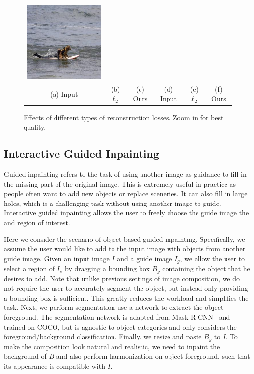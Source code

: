 \begin{figure}[h!]
\begin{tabular}{cccccc}
\includegraphics[width=.16\textwidth]{figures/loss/000000490171_synthesized_image.jpg}\\
(a) Input & (b) $\ell_2$ & (c) Ours & (d) Input & (e) $\ell_2$ & (f) Ours\\
\end{tabular}
\caption{Effects of different types of reconstruction losses. Zoom in for best quality.}
\label{fig:face}
\vspace{-5pt}
\end{figure}  

\subsection{Interactive Guided Inpainting}
\label{exp:guided} 

Guided inpainting refers to the task of using another image as guidance to fill in the missing part of the original image. This is extremely useful in practice as people often want to add new objects or replace sceneries. It can also fill in large holes, which is a challenging task without using another image to guide. Interactive guided inpainting allows the user to freely choose the guide image the and region of interest.

Here we consider the scenario of object-based guided inpainting. Specifically, we assume the user would like to add to the input image with objects from another guide image. Given an input image $I$ and a guide image $I_g$, we allow the user to select a region of $I_s$ by dragging a bounding box $B_g$ containing the object that he desires to add. Note that unlike previous settings of image composition, we do not require the user to accurately segment the object, but instead only providing a bounding box is sufficient. This greatly reduces the workload and simplifies the task. Next, we perform segmentation use a network to extract the object foreground. The segmentation network is adapted from Mask R-CNN~\cite{he2017mask} and trained on COCO, but is agnostic to object categories and only considers the foreground/background classification. Finally, we resize and paste $B_g$ to $I$. To make the composition look natural and realistic, we need to inpaint the background of $B$ and also perform harmonization on object foreground, such that its appearance is compatible with $I$.   

